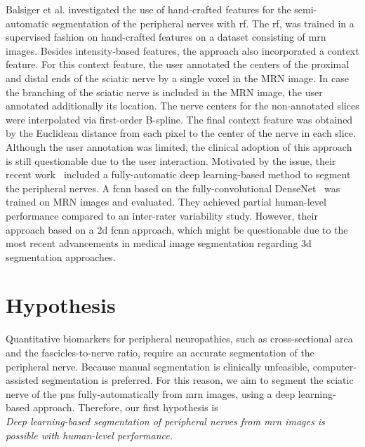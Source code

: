 Balsiger et al. investigated the use of hand-crafted features for the semi-automatic segmentation of the peripheral nerves with \gls{rf}. The \gls{rf}, was trained in a supervised fashion on hand-crafted features on a dataset consisting of \gls{mrn} images. Besides intensity-based features, the approach also incorporated a context feature. For this context feature, the user annotated the centers of the proximal and distal ends of the sciatic nerve by a single voxel in the MRN image. In case the branching of the sciatic nerve is included in the MRN image, the user annotated additionally its location. The nerve centers for the non-annotated slices were interpolated via first-order B-spline. The final context feature was obtained by the Euclidean distance from each pixel to the center of the nerve in each slice. Although the user annotation was limited, the clinical adoption of this approach is still questionable due to the user interaction. Motivated by the issue, their recent work~\cite{Balsiger2018SegmentationApproach} included a  fully-automatic deep learning-based method to segment the peripheral nerves. A \gls{fcnn} based on the fully-convolutional DenseNet~\cite{Huang2017DenselyNetworks} was trained on MRN images and evaluated. They achieved partial human-level performance compared to an inter-rater variability study. However, their approach based on a \gls{2d} \gls{fcnn} approach, which might be questionable due to the most recent advancements in medical image segmentation regarding \gls{3d} segmentation approaches. 

\section{Hypothesis} %
Quantitative biomarkers for peripheral neuropathies, such as cross-sectional area and the fascicles-to-nerve ratio, require an accurate segmentation of the peripheral nerve. Because manual segmentation is clinically unfeasible, computer-assisted segmentation is preferred.
For this reason, we aim to segment the sciatic nerve of the \gls{pns} fully-automatically from \acrshort{mrn} images, using a deep learning-based approach. Therefore, our first hypothesis is\\

\textit{Deep learning-based segmentation of peripheral nerves from \gls{mrn} images is possible with human-level performance.} \\

